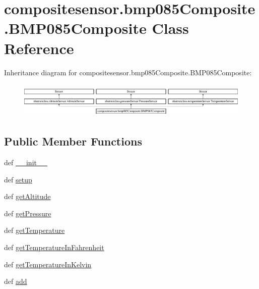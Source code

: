\hypertarget{classcompositesensor_1_1bmp085Composite_1_1BMP085Composite}{}\section{compositesensor.\+bmp085\+Composite.\+B\+M\+P085\+Composite Class Reference}
\label{classcompositesensor_1_1bmp085Composite_1_1BMP085Composite}
Inheritance diagram for compositesensor.\+bmp085\+Composite.\+B\+M\+P085\+Composite\+:\begin{figure}[H]
\begin{center}
\leavevmode
\includegraphics[height=1.696970cm]{classcompositesensor_1_1bmp085Composite_1_1BMP085Composite}
\end{center}
\end{figure}
\subsection*{Public Member Functions}
\begin{DoxyCompactItemize}
\item 
def \hyperlink{classcompositesensor_1_1bmp085Composite_1_1BMP085Composite_ac13b7e0050253ef1a01f570789ad97c5}{\+\_\+\+\_\+init\+\_\+\+\_\+}
\item 
def \hyperlink{classcompositesensor_1_1bmp085Composite_1_1BMP085Composite_aba11c98cb1b668b484de7925b1ac1005}{setup}
\item 
def \hyperlink{classcompositesensor_1_1bmp085Composite_1_1BMP085Composite_a5455bb23cd03d43ae508aa816493028e}{get\+Altitude}
\item 
def \hyperlink{classcompositesensor_1_1bmp085Composite_1_1BMP085Composite_a8dce4bd54afc7a71e8b70503d0086bf9}{get\+Pressure}
\item 
def \hyperlink{classcompositesensor_1_1bmp085Composite_1_1BMP085Composite_a8867c87ee5dcb955cd1e48715db56ef3}{get\+Temperature}
\item 
def \hyperlink{classcompositesensor_1_1bmp085Composite_1_1BMP085Composite_a84e21e7106d56f3e27f851fd345005f6}{get\+Temperature\+In\+Fahrenheit}
\item 
def \hyperlink{classcompositesensor_1_1bmp085Composite_1_1BMP085Composite_aad842e7090e4bac97f68aea0fa343d41}{get\+Temperature\+In\+Kelvin}
\item 
def \hyperlink{classcompositesensor_1_1bmp085Composite_1_1BMP085Composite_acc98240a261b0c61f632433427862320}{add}
\end{DoxyCompactItemize}

